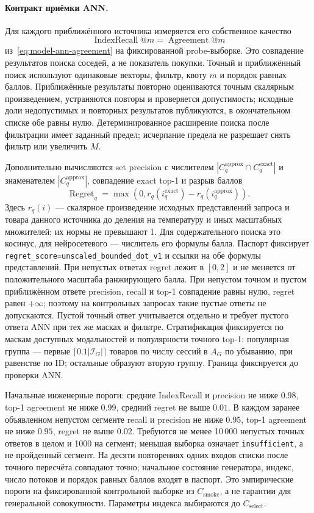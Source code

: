\documentclass[12pt,a4paper]{article}
\newcommand{\code}[1]{{\ttfamily\small\nolinkurl{#1}}}
\theoremstyle{plainru}
\begin{document}
\paragraph{Контракт приёмки ANN.}\label{sec:ops-ann-contract}
Для каждого приближённого источника измеряется его собственное качество
\begin{equation}\label{eq:ops-ann-recall}
\operatorname{IndexRecall}@m=\operatorname{Agreement}@m
\end{equation}
из~\eqref{eq:model-ann-agreement} на фиксированной probe-выборке.
Это совпадение результатов поиска соседей, а не показатель покупки.
Точный и приближённый поиск используют одинаковые векторы, фильтр,
квоту $m$ и порядок равных баллов. Приближённые результаты повторно
оцениваются точным скалярным произведением, устраняются повторы
и проверяется допустимость; исходные доли недопустимых и повторных
результатов публикуются, в окончательном списке обе равны нулю.
Детерминированное расширение поиска после фильтрации имеет заданный
предел; исчерпание предела не разрешает снять фильтр или увеличить $M$.

Дополнительно вычисляются set precision с числителем
$|C_q^{\mathrm{approx}}\cap C_q^{\mathrm{exact}}|$ и знаменателем
$|C_q^{\mathrm{approx}}|$, совпадение exact top-1 и разрыв баллов
\[
\operatorname{Regret}_q=
\max(0,r_q(i_q^{\mathrm{exact}})-r_q(i_q^{\mathrm{approx}})).
\]
Здесь $r_q(i)$ --- скалярное произведение исходных представлений
запроса и товара данного источника до деления на температуру и
иных масштабных множителей; их нормы не превышают 1. Для содержательного
поиска это косинус, для нейросетевого --- числитель его формулы балла.
Паспорт фиксирует \code{regret_score=unscaled_bounded_dot_v1} и ссылки
на обе формулы представлений. При непустых ответах regret лежит
в $[0,2]$ и не меняется от положительного масштаба ранжирующего балла.
При непустом точном и пустом приближённом ответе precision, recall
и top-1 совпадение равны нулю, regret равен $+\infty$;
поэтому на контрольных запросах такие пустые ответы не допускаются.
Пустой точный ответ учитывается отдельно и требует пустого ответа
ANN при тех же масках и фильтре. Стратификация фиксируется
по маскам доступных модальностей и популярности точного top-1:
популярная группа --- первые $\lceil0.1|\mathcal I_G|\rceil$ товаров
по числу сессий в $A_G$ по убыванию, при равенстве по ID;
остальные образуют вторую группу. Граница фиксируется до проверки ANN.

Начальные инженерные пороги: средние IndexRecall и precision
не ниже $0.98$, top-1 agreement не ниже $0.99$, средний regret
не выше $0.01$. В каждом заранее объявленном непустом сегменте
recall и precision не ниже $0.95$, top-1 agreement не ниже $0.95$,
regret не выше $0.02$. Требуются не менее 10\,000 непустых точных
ответов в целом и 1000 на сегмент; меньшая выборка означает
\code{insufficient}, а не пройденный сегмент. На десяти повторениях
одних входов списки после точного пересчёта совпадают точно;
начальное состояние генератора, индекс, число потоков
и порядок равных баллов входят в паспорт.
Это эмпирические пороги на фиксированной контрольной выборке из
$C_{\mathrm{smoke}}$, а не гарантии для генеральной совокупности.
Параметры индекса выбираются до $C_{\mathrm{select}}$.
\end{document}
